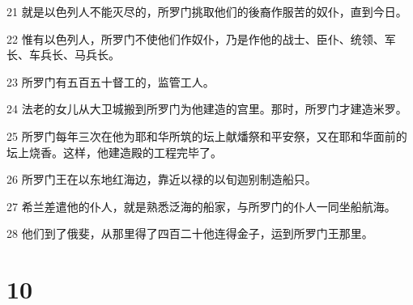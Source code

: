 \par 21 就是以色列人不能灭尽的，所罗门挑取他们的後裔作服苦的奴仆，直到今日。
\par 22 惟有以色列人，所罗门不使他们作奴仆，乃是作他的战士、臣仆、统领、军长、车兵长、马兵长。
\par 23 所罗门有五百五十督工的，监管工人。
\par 24 法老的女儿从大卫城搬到所罗门为他建造的宫里。那时，所罗门才建造米罗。
\par 25 所罗门每年三次在他为耶和华所筑的坛上献燔祭和平安祭，又在耶和华面前的坛上烧香。这样，他建造殿的工程完毕了。
\par 26 所罗门王在以东地红海边，靠近以禄的以旬迦别制造船只。
\par 27 希兰差遣他的仆人，就是熟悉泛海的船家，与所罗门的仆人一同坐船航海。
\par 28 他们到了俄斐，从那里得了四百二十他连得金子，运到所罗门王那里。

\chapter{10}

